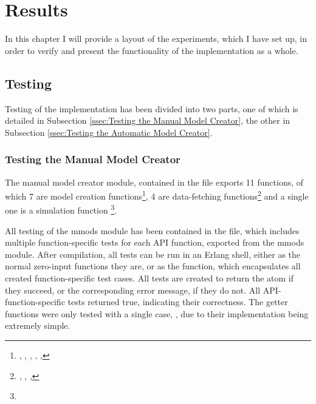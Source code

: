 \chapter{Results}

In this chapter I will provide a layout of the experiments, which I have set up, in order to verify and present the functionality of the implementation as a whole.

\section{Testing}

Testing of the implementation has been divided into two parts, one of which is detailed in Subsection \ref{ssec:Testing the Manual Model Creator}, the other in Subsection \ref{ssec:Testing the Automatic Model Creator}.

\subsection{Testing the Manual Model Creator}
The manual model creator module, contained in the file  exports 11 functions, of which 7 are model creation functions\footnote{, , , , , }, 4 are data-fetching functions\footnote{, , , } and a single one is a simulation function \footnote{}.

All testing of the mmods module has been contained in the  file, which includes multiple function-specific tests for each API function, exported from the mmods module. After compilation, all tests can be run in an Erlang shell, either as the normal zero-input functions they are, or as the  function, which encapsulates all created function-specific test cases. All tests are created to return the atom  if they succeed, or the corresponding error message, if they do not. All API-function-specific tests returned true, indicating their correctness. The getter functions were only tested with a single case, , due to their implementation being extremely simple.

